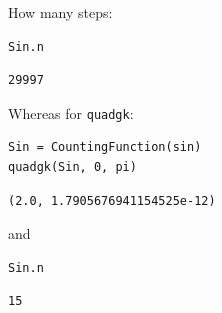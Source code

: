 \documentclass[12pt]{article}
\begin{document}
How many steps:

\begin{Verbatim}[framesep=1mm,frame=leftline,fontfamily=courier,formatcom=\color{darker-gray}]
Sin.n
\end{Verbatim}
\begin{Verbatim}[framesep=3mm,frame=leftline, fontshape=it,formatcom=\color{darker-gray}]
29997
\end{Verbatim}
 

Whereas for \texttt{quadgk}:

\begin{Verbatim}[framesep=1mm,frame=leftline,fontfamily=courier,formatcom=\color{darker-gray}]
Sin = CountingFunction(sin)
quadgk(Sin, 0, pi)
\end{Verbatim}
\begin{Verbatim}[framesep=3mm,frame=leftline, fontshape=it,formatcom=\color{darker-gray}]
(2.0, 1.7905676941154525e-12)
\end{Verbatim}
 

and

\begin{Verbatim}[framesep=1mm,frame=leftline,fontfamily=courier,formatcom=\color{darker-gray}]
Sin.n
\end{Verbatim}
\begin{Verbatim}[framesep=3mm,frame=leftline, fontshape=it,formatcom=\color{darker-gray}]
15
\end{Verbatim}
 
\end{document}
